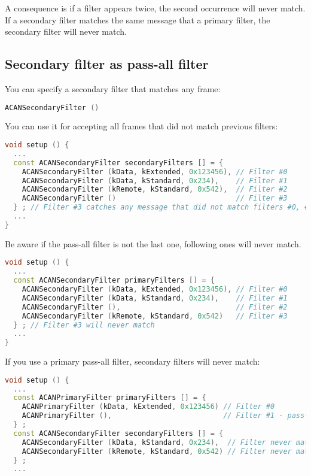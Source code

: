 \documentclass[9pt, a4paper, obeyspaces, openany]{extarticle}
\newcommand \subsectionLabel[2]{\subsection{#1}\label{subsec:#2}}
\begin{document}
A consequence is if a filter appears twice, the second occurrence will never match. If a secondary filter matches the same message that a primary filter, the secondary filter will never match.


\subsectionLabel{Secondary filter as pass-all filter}{passAllSecondaryFilter}

You can specify a secondary filter that matches any frame: 
{ \small\begin{lstlisting}[language=c++]
    ACANSecondaryFilter ()
\end{lstlisting}}

You can use it for accepting all frames that did not match previous filters:
{ \small\begin{lstlisting}[language=c++]
void setup () {
  ...
  const ACANSecondaryFilter secondaryFilters [] = {
    ACANSecondaryFilter (kData, kExtended, 0x123456), // Filter #0
    ACANSecondaryFilter (kData, kStandard, 0x234),    // Filter #1
    ACANSecondaryFilter (kRemote, kStandard, 0x542),  // Filter #2
    ACANSecondaryFilter ()                            // Filter #3
  } ; // Filter #3 catches any message that did not match filters #0, #1 and #2
  ...
}
\end{lstlisting}}

Be aware if the pass-all filter is not the last one, following ones will never match.
{ \small\begin{lstlisting}[language=c++]
void setup () {
  ...
  const ACANSecondaryFilter primaryFilters [] = {
    ACANSecondaryFilter (kData, kExtended, 0x123456), // Filter #0
    ACANSecondaryFilter (kData, kStandard, 0x234),    // Filter #1
    ACANSecondaryFilter (),                           // Filter #2
    ACANSecondaryFilter (kRemote, kStandard, 0x542)   // Filter #3
  } ; // Filter #3 will never match
  ...
}
\end{lstlisting}}

If you use a primary pass-all filter, secondary filters will never match:
{ \small\begin{lstlisting}[language=c++]
void setup () {
  ...
  const ACANPrimaryFilter primaryFilters [] = {
    ACANPrimaryFilter (kData, kExtended, 0x123456) // Filter #0
    ACANPrimaryFilter (),                          // Filter #1 - pass-all
  } ;
  const ACANSecondaryFilter secondaryFilters [] = {
    ACANSecondaryFilter (kData, kStandard, 0x234),  // Filter never matches
    ACANSecondaryFilter (kRemote, kStandard, 0x542) // Filter never matches
  } ;
  ...
\end{lstlisting}}
\end{document}
